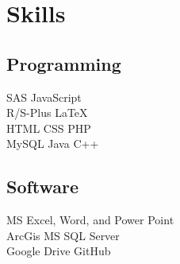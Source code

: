 \documentclass[]{deedy-resume-openfont}
\begin{document}
%
%

%
%



%
%

\begin{minipage}[t]{0.33\textwidth} 

\section{Skills}
\subsection{Programming}
 SAS \textbullet{} JavaScript \textbullet{}\\ R/S-Plus \textbullet{} \LaTeX\ \\ 
 HTML \textbullet{} CSS \textbullet{} PHP \\
 MySQL \textbullet{} Java \textbullet{} C++
\sectionsep 

\subsection{Software}
MS Excel, Word, and Power Point\\
ArcGis \textbullet{} MS SQL Server\\
Google Drive \textbullet{} GitHub
\sectionsep




\end{minipage}
\end{document}
